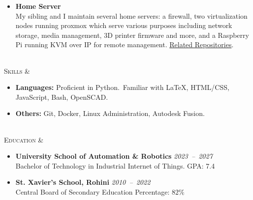\documentclass[11pt]{article}
\begin{document}
\begin{tblr}
\begin{itemize}[topsep=0pt,leftmargin=15pt]
            \item \textbf{Home Server}\\
            My sibling and I maintain several home servers: a firewall, two virtualization nodes running proxmox which
            serve various purposes including network storage, media management, 3D printer firmware and more, and a
            Raspberry Pi running KVM over IP for remote management.
            \href{https://github.com/xserv-labs}{\color{blue}Related Repositories}.\
        \end{itemize}
        \\
        \textsc{\Large Skills} &
        \vspace*{-1.5\topsep}
        \begin{itemize}[topsep=0pt,leftmargin=15pt]
            \item \textbf{Languages:} Proficient in Python.\ Familiar with \LaTeX, HTML/CSS, JavaScript, Bash, OpenSCAD.
            \item \textbf{Others:} Git, Docker, Linux Administration, Autodesk Fusion.
        \end{itemize}
        \\
        \textsc{\Large Education} &
        \vspace*{-1.5\topsep}
        \begin{itemize}[topsep=0pt,leftmargin=15pt]
            \item \textbf{University School of Automation \& Robotics} \hfill \textit{2023~--~2027} \\
            Bachelor of Technology in Industrial Internet of Things. \hfill GPA: 7.4
            \item \textbf{St. Xavier's School, Rohini} \hfill \textit{2010~--~2022} \\
            Central Board of Secondary Education \hfill Percentage: $82\%$
        \end{itemize}
    \end{tblr}
\end{document}
